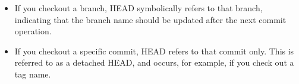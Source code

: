 \documentclass{report}
\begin{document}
\begin{itemize}
\begin{itemize}
                    \begin{itemize}
                        \item If you checkout a branch, HEAD symbolically refers to that branch, indicating that the branch name should be updated after the next commit operation.
                        \item If you checkout a specific commit, HEAD refers to that commit only. This is referred to as a detached HEAD, and occurs, for example, if you check out a tag name.
                    \end{itemize}
            \end{itemize}
            \bigbreak \noindent 
    \end{itemize}

    \pagebreak 
\end{document}
